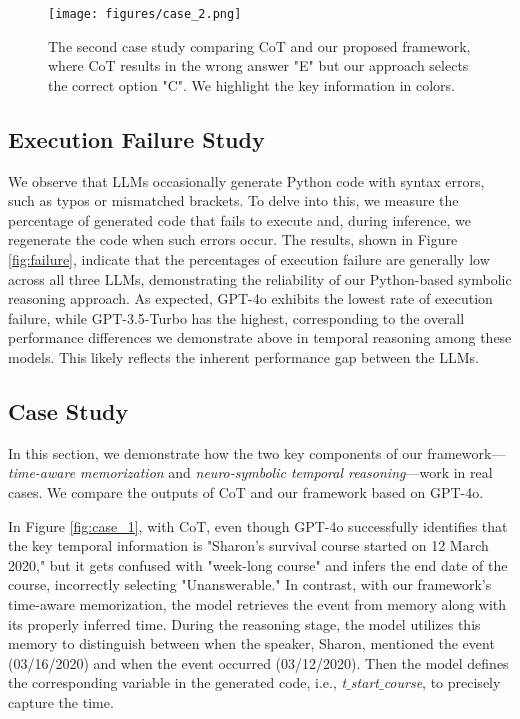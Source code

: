 \begin{figure*}
    \centering
    \texttt{[image: figures/case\_2.png]}
    \caption{The second case study comparing CoT and our proposed framework, where CoT results in the wrong answer "E" but our approach selects the correct option "C". We highlight the key information in colors.}
    \label{fig:case_2}
\vspace{-0.5cm}
\end{figure*}

\subsection{Execution Failure Study}
We observe that LLMs occasionally generate Python code with syntax errors, such as typos or mismatched brackets. To delve into this, we measure the percentage of generated code that fails to execute and, during inference, we regenerate the code when such errors occur. The results, shown in Figure \ref{fig:failure}, indicate that the percentages of execution failure are generally low across all three LLMs, demonstrating the reliability of our Python-based symbolic reasoning approach. As expected, GPT-4o exhibits the lowest rate of execution failure, while GPT-3.5-Turbo has the highest, corresponding to the overall performance differences we demonstrate above in temporal reasoning among these models. This likely reflects the inherent performance gap between the LLMs.

\subsection{Case Study}
In this section, we demonstrate how the two key components of our framework—\textit{time-aware memorization} and \textit{neuro-symbolic temporal reasoning}—work in real cases. We compare the outputs of CoT and our framework based on GPT-4o.

In Figure \ref{fig:case_1}, with CoT, even though GPT-4o successfully identifies that the key temporal information is "Sharon's survival course started on 12 March 2020," but it gets confused with "week-long course" and infers the end date of the course, incorrectly selecting "Unanswerable." In contrast, with our framework’s time-aware memorization, the model retrieves the event from memory along with its properly inferred time. During the reasoning stage, the model utilizes this memory to distinguish between when the speaker, Sharon, mentioned the event (03/16/2020) and when the event occurred (03/12/2020). Then the model defines the corresponding variable in the generated code, i.e., \textit{t$\_$start$\_$course}, to precisely capture the time.

